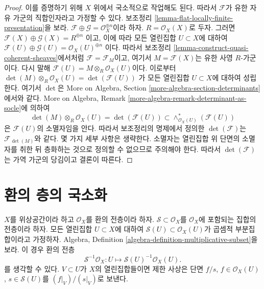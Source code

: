 \begin{proof}
이를 증명하기 위해 $X$ 위에서 국소적으로 작업해도 된다. 따라서
$\mathcal{F}$가 유한 자유 가군의 직합인자라고 가정할 수 있다.
보조정리 \ref{lemma-flat-locally-finite-presentation}을 보라.
$\mathcal{F} \oplus \mathcal{G} = \mathcal{O}_X^{\oplus n}$이라 하자.
$R = \mathcal{O}_X(X)$로 두자. 그러면
$\mathcal{F}(X) \oplus \mathcal{G}(X) = R^{\oplus n}$
이고, 이에 따라 모든 열린집합 $U \subset X$에 대하여
$\mathcal{F}(U) \oplus \mathcal{G}(U) = \mathcal{O}_X(U)^{\oplus n}$
이다. 따라서 보조정리 \ref{lemma-construct-quasi-coherent-sheaves}에서처럼
$\mathcal{F} = \mathcal{F}_M$이고, 여기서
$M = \mathcal{F}(X)$는 유한 사영 $R$-가군이다. 다시 말해
$\mathcal{F}(U) = M \otimes_R \mathcal{O}_X(U)$이다. 이로부터
$\det(M) \otimes_R \mathcal{O}_X(U) = \det(\mathcal{F}(U))$
가 모든 열린집합 $U \subset X$에 대하여 성립한다. 여기서 $\det$은
More on Algebra, Section \ref{more-algebra-section-determinants}에서와 같다.
More on Algebra, Remark \ref{more-algebra-remark-determinant-as-socle}에
의하여
$$
\det(M) \otimes_R \mathcal{O}_X(U) =
\det(\mathcal{F}(U)) \subset
\wedge^*_{\mathcal{O}_X(U)}(\mathcal{F}(U))
$$
은 $\mathcal{F}(U)$의 소멸자임을 안다. 따라서 보조정리의 명제에서
정의한 $\det(\mathcal{F})$는 $\mathcal{F}_{\det(M)}$와 같다.
몇 가지 세부 사항은 생략한다. 소멸자는 열린집합 위 단면의 소멸자를
취한 뒤 층화하는 것으로 정의할 수 없으므로 주의해야 한다.
따라서 $\det(\mathcal{F})$는 가역 가군의 당김이고 결론이 따른다.
\end{proof}
















\section{환의 층의 국소화}
\label{section-localizing-sheaves-rings}

\noindent
$X$를 위상공간이라 하고 $\mathcal{O}_X$를 환의 전층이라 하자.
$\mathcal{S} \subset \mathcal{O}_X$를 $\mathcal{O}_X$에 포함되는
집합의 전층이라 하자. 모든 열린집합 $U \subset X$에 대하여
$\mathcal{S}(U) \subset \mathcal{O}_X(U)$가 곱셈적 부분집합이라고
가정하자. Algebra, Definition
\ref{algebra-definition-multiplicative-subset}을 보라.
이 경우 환의 전층
$$
\mathcal{S}^{-1}\mathcal{O}_X :
U \longmapsto \mathcal{S}(U)^{-1}\mathcal{O}_X(U).
$$
를 생각할 수 있다. $V \subset U$가 $X$의 열린집합들이면 제한 사상은
단면 $f/s$, $f \in \mathcal{O}_X(U)$, $s \in \mathcal{S}(U)$를
$(f|_V)/(s|_V)$로 보낸다.

